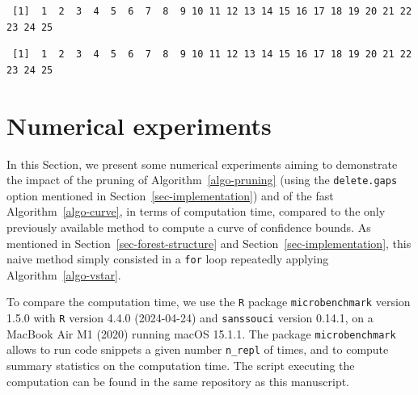 \documentclass[
  11pt,
  a4paper,
]{article}
\newenvironment{Shaded}{}{}
\newcommand{\AttributeTok}[1]{\textcolor[rgb]{0.84,0.23,0.29}{#1}}
\newcommand{\ConstantTok}[1]{\textcolor[rgb]{0.00,0.36,0.77}{#1}}
\newcommand{\FunctionTok}[1]{\textcolor[rgb]{0.44,0.26,0.76}{#1}}
\newcommand{\NormalTok}[1]{\textcolor[rgb]{0.14,0.16,0.18}{#1}}
\newcommand{\OtherTok}[1]{\textcolor[rgb]{0.44,0.26,0.76}{#1}}
\newcommand{\SpecialCharTok}[1]{\textcolor[rgb]{0.00,0.36,0.77}{#1}}
\theoremstyle{plain}
\theoremstyle{definition}
\theoremstyle{plain}
\theoremstyle{definition}
\theoremstyle{plain}
\theoremstyle{remark}
\begin{document}
\begin{verbatim}
 [1]  1  2  3  4  5  6  7  8  9 10 11 12 13 14 15 16 17 18 19 20 21 22 23 24 25
\end{verbatim}

\begin{Shaded}
\end{Shaded}

\begin{verbatim}
 [1]  1  2  3  4  5  6  7  8  9 10 11 12 13 14 15 16 17 18 19 20 21 22 23 24 25
\end{verbatim}

\section{Numerical experiments}\label{sec-numeric}

In this Section, we present some numerical experiments aiming to
demonstrate the impact of the pruning of Algorithm~\ref{algo-pruning}
(using the \texttt{delete.gaps} option mentioned in
Section~\ref{sec-implementation}) and of the fast
Algorithm~\ref{algo-curve}, in terms of computation time, compared to
the only previously available method to compute a curve of confidence
bounds. As mentioned in Section~\ref{sec-forest-structure} and
Section~\ref{sec-implementation}, this naive method simply consisted in
a \texttt{for} loop repeatedly applying Algorithm~\ref{algo-vstar}.

To compare the computation time, we use the \texttt{R} package
\texttt{microbenchmark} version 1.5.0 \citep{microbenchmark} with
\texttt{R} version 4.4.0 (2024-04-24) and \texttt{sanssouci} version
0.14.1, on a MacBook Air M1 (2020) running macOS 15.1.1. The package
\texttt{microbenchmark} allows to run code snippets a given number
\texttt{n\_repl} of times, and to compute summary statistics on the
computation time. The script executing the computation can be found in
the same repository as this manuscript.
\end{document}
